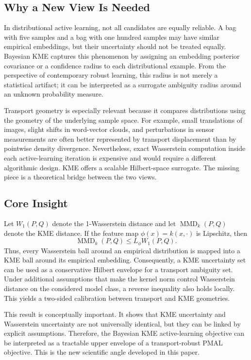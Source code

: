 \documentclass[10pt,journal]{IEEEtran}
\DeclareMathOperator{\MMD}{MMD}
\begin{document}
\subsection{Why a New View Is Needed}

In distributional active learning, not all candidates are equally reliable. A bag with five samples and a bag with one hundred samples may have similar empirical embeddings, but their uncertainty should not be treated equally. Bayesian KME captures this phenomenon by assigning an embedding posterior covariance or a confidence radius to each distributional example. From the perspective of contemporary robust learning, this radius is not merely a statistical artifact; it can be interpreted as a surrogate ambiguity radius around an unknown probability measure.

Transport geometry is especially relevant because it compares distributions using the geometry of the underlying sample space. For example, small translations of images, slight shifts in word-vector clouds, and perturbations in sensor measurements are often better represented by transport displacement than by pointwise density divergence. Nevertheless, exact Wasserstein computation inside each active-learning iteration is expensive and would require a different algorithmic design. KME offers a scalable Hilbert-space surrogate. The missing piece is a theoretical bridge between the two views.

\subsection{Core Insight}

Let $W_1(P,Q)$ denote the 1-Wasserstein distance and let $\MMD_k(P,Q)$ denote the KME distance. If the feature map $\phi(x)=k(x,\cdot)$ is Lipschitz, then
\begin{equation}
    \MMD_k(P,Q) \le L_\phi W_1(P,Q).
\end{equation}
Thus, every Wasserstein ball around an empirical distribution is mapped into a KME ball around its empirical embedding. Consequently, a KME uncertainty set can be used as a conservative Hilbert envelope for a transport ambiguity set. Under additional assumptions that make the kernel norm control Wasserstein distance on the considered model class, a reverse inequality also holds locally. This yields a two-sided calibration between transport and KME geometries.

This result is conceptually important. It shows that KME uncertainty and Wasserstein uncertainty are not universally identical, but they can be linked by explicit assumptions. Therefore, the Bayesian KME active-learning objective can be interpreted as a tractable upper envelope of a transport-robust PMAL objective. This is the new scientific angle developed in this paper.
\end{document}
